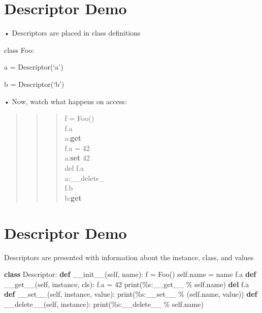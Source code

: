 \documentclass[
  letterpaper,
  DIV=11,
  numbers=noendperiod]{scrreprt}
\newenvironment{Shaded}{\begin{snugshade}}{\end{snugshade}}
\newcommand{\BuiltInTok}[1]{\textcolor[rgb]{0.00,0.23,0.31}{#1}}
\newcommand{\DecValTok}[1]{\textcolor[rgb]{0.68,0.00,0.00}{#1}}
\newcommand{\FunctionTok}[1]{\textcolor[rgb]{0.28,0.35,0.67}{#1}}
\newcommand{\KeywordTok}[1]{\textcolor[rgb]{0.00,0.23,0.31}{\textbf{#1}}}
\newcommand{\NormalTok}[1]{\textcolor[rgb]{0.00,0.23,0.31}{#1}}
\newcommand{\OperatorTok}[1]{\textcolor[rgb]{0.37,0.37,0.37}{#1}}
\newcommand{\SpecialCharTok}[1]{\textcolor[rgb]{0.37,0.37,0.37}{#1}}
\newcommand{\StringTok}[1]{\textcolor[rgb]{0.13,0.47,0.30}{#1}}
\newcommand{\VariableTok}[1]{\textcolor[rgb]{0.07,0.07,0.07}{#1}}
\begin{document}
\chapter{Descriptor Demo}\label{descriptor-demo-1}

• Descriptors are placed in class definitions

class Foo:

a = Descriptor(`a')

b = Descriptor(`b')

• Now, watch what happens on access:

\begin{quote}
\begin{quote}
\begin{quote}
f = Foo()\\
f.a\\
a:\textbf{get}\\
f.a = 42\\
a:\textbf{set} 42\\
del f.a\\
a:\_\_delete\_\\
f.b\\
b:\textbf{get}
\end{quote}
\end{quote}
\end{quote}


\chapter{Descriptor Demo}\label{descriptor-demo-2}

Descriptors are presented with information about the instance, class,
and values

\begin{Shaded}
\begin{Highlighting}[]
\KeywordTok{class}\NormalTok{ Descriptor: }\KeywordTok{def} \FunctionTok{\_\_init\_\_}\NormalTok{(}\VariableTok{self}\NormalTok{, name): f }\OperatorTok{=}\NormalTok{ Foo() }\VariableTok{self}\NormalTok{.name }\OperatorTok{=}\NormalTok{ name f.a }\KeywordTok{def} \FunctionTok{\_\_get\_\_}\NormalTok{(}\VariableTok{self}\NormalTok{, instance, cls): f.a }\OperatorTok{=} \DecValTok{42} \BuiltInTok{print}\NormalTok{(}\StringTok{\textquotesingle{}}\SpecialCharTok{\%s}\StringTok{:\_\_get\_\_\textquotesingle{}} \OperatorTok{\%} \VariableTok{self}\NormalTok{.name) }\KeywordTok{del}\NormalTok{ f.a }\KeywordTok{def} \FunctionTok{\_\_set\_\_}\NormalTok{(}\VariableTok{self}\NormalTok{, instance, value): }\BuiltInTok{print}\NormalTok{(}\StringTok{\textquotesingle{}}\SpecialCharTok{\%s}\StringTok{:\_\_set\_\_\textquotesingle{}} \OperatorTok{\%}\NormalTok{ (}\VariableTok{self}\NormalTok{.name, value)) }\KeywordTok{def} \FunctionTok{\_\_delete\_\_}\NormalTok{(}\VariableTok{self}\NormalTok{, instance): }\BuiltInTok{print}\NormalTok{(}\StringTok{\textquotesingle{}}\SpecialCharTok{\%s}\StringTok{:\_\_delete\_\_\textquotesingle{}} \OperatorTok{\%} \VariableTok{self}\NormalTok{.name) }
\end{Highlighting}
\end{Shaded}
\end{document}
